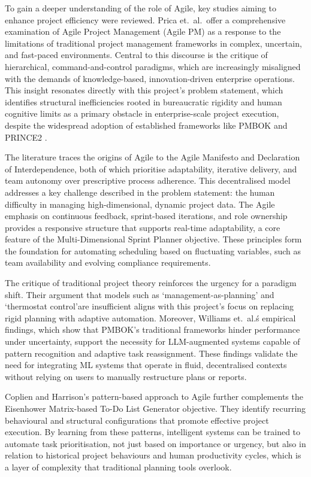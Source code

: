 \documentclass{report}
\begin{document}
To gain a deeper understanding of the role of Agile, key studies aiming to enhance project efficiency were reviewed. 
Prica et.\ al.\ offer a comprehensive examination of Agile Project Management (Agile PM) as a response to the limitations of traditional project management frameworks in complex, uncertain, and fast-paced environments. 
Central to this discourse is the critique of hierarchical, command-and-control paradigms, which are increasingly misaligned with the demands of knowledge-based, innovation-driven enterprise operations. 
This insight resonates directly with this project's problem statement, which identifies structural inefficiencies rooted in bureaucratic rigidity and human cognitive limits as a primary obstacle in enterprise-scale project execution, despite the widespread adoption of established frameworks like PMBOK and PRINCE2 \parencite{pricaEnhancingProjectEfficiency2025}.

The literature traces the origins of Agile to the Agile Manifesto and Declaration of Interdependence, both of which prioritise adaptability, iterative delivery, and team autonomy over prescriptive process adherence. 
This decentralised model addresses a key challenge described in the problem statement: the human difficulty in managing high-dimensional, dynamic project data. 
The Agile emphasis on continuous feedback, sprint-based iterations, and role ownership provides a responsive structure that supports real-time adaptability, a core feature of the Multi-Dimensional Sprint Planner objective. 
These principles form the foundation for automating scheduling based on fluctuating variables, such as team availability and evolving compliance requirements.

The critique of traditional project theory reinforces the urgency for a paradigm shift. Their argument that models such as `management-as-planning' and `thermostat control'are insufficient aligns with this project's focus on replacing rigid planning with adaptive automation. 
Moreover, Williams et.\ al.\'s empirical findings, which show that PMBOK's traditional frameworks hinder performance under uncertainty, support the necessity for LLM-augmented systems capable of pattern recognition and adaptive task reassignment.
These findings validate the need for integrating ML systems that operate in fluid, decentralised contexts without relying on users to manually restructure plans or reports.

Coplien and Harrison's pattern-based approach to Agile further complements the Eisenhower Matrix-based To-Do List Generator objective. 
They identify recurring behavioural and structural configurations that promote effective project execution. 
By learning from these patterns, intelligent systems can be trained to automate task prioritisation, not just based on importance or urgency, but also in relation to historical project behaviours and human productivity cycles, which is a layer of complexity that traditional planning tools overlook.
\end{document}
